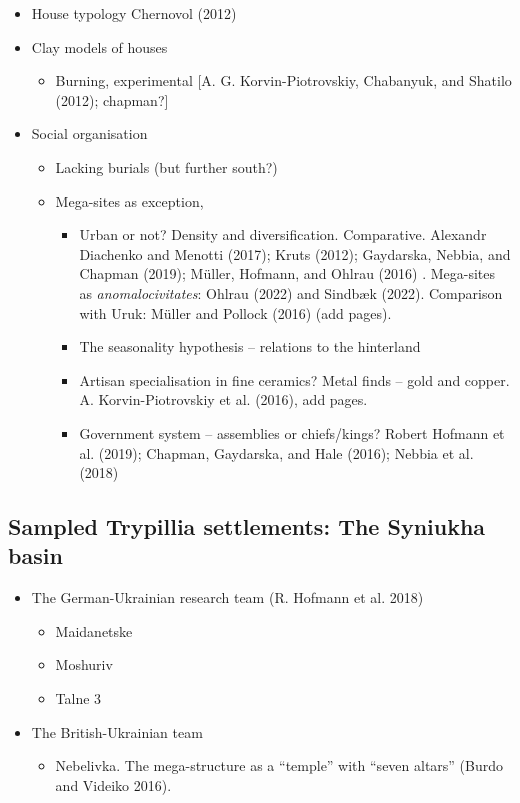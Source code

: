 \documentclass[
  12pt,
  a4paper, twoside]{book}
\providecommand{\tightlist}{%
  \setlength{\itemsep}{0pt}\setlength{\parskip}{0pt}}
\begin{document}
\begin{itemize}
\item
  House typology Chernovol (2012)
\item
  Clay models of houses

  \begin{itemize}
  \tightlist
  \item
    Burning, experimental {[}A. G. Korvin-Piotrovskiy, Chabanyuk, and Shatilo (2012); chapman?{]}
  \end{itemize}
\item
  Social organisation

  \begin{itemize}
  \item
    Lacking burials (but further south?)
  \item
    Mega-sites as exception,

    \begin{itemize}
    \item
      Urban or not? Density and diversification. Comparative. Alexandr Diachenko and Menotti (2017); Kruts (2012); Gaydarska, Nebbia, and Chapman (2019); Müller, Hofmann, and Ohlrau (2016) . Mega-sites as \emph{anomalocivitates}: Ohlrau (2022) and Sindbæk (2022). Comparison with Uruk: Müller and Pollock (2016) (add pages).
    \item
      The seasonality hypothesis -- relations to the hinterland
    \item
      Artisan specialisation in fine ceramics? Metal finds -- gold and copper. A. Korvin-Piotrovskiy et al. (2016), add pages.
    \item
      Government system -- assemblies or chiefs/kings? Robert Hofmann et al. (2019); Chapman, Gaydarska, and Hale (2016); Nebbia et al. (2018)
    \end{itemize}
  \end{itemize}
\end{itemize}

\hypertarget{sampled-trypillia-settlements-the-syniukha-basin}{%
\subsection{Sampled Trypillia settlements: The Syniukha basin}\label{sampled-trypillia-settlements-the-syniukha-basin}}

\begin{itemize}
\item
  The German-Ukrainian research team (R. Hofmann et al. 2018)

  \begin{itemize}
  \item
    Maidanetske
  \item
    Moshuriv
  \item
    Talne 3
  \end{itemize}
\item
  The British-Ukrainian team

  \begin{itemize}
  \tightlist
  \item
    Nebelivka. The mega-structure as a ``temple'' with ``seven altars'' (Burdo and Videiko 2016).
  \end{itemize}
\end{itemize}
\end{document}
